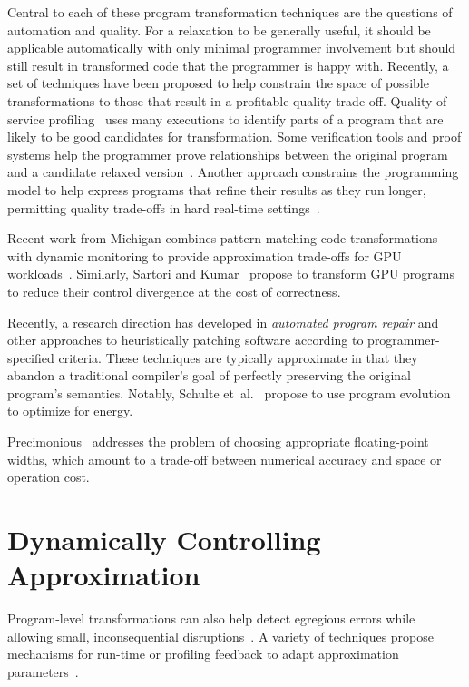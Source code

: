 Central to each of these program transformation techniques are the questions
of automation and quality. For a relaxation to be generally useful, it should
be applicable automatically with only minimal programmer involvement but
should still result in transformed code that the programmer is happy with.
Recently, a set of techniques have been proposed to help constrain the space
of possible transformations to those that result in a profitable
quality trade-off. Quality of service profiling~\cite{qosprof} uses many
executions to identify parts of a program that are likely to be good
candidates for transformation. Some verification tools and proof systems help
the programmer prove relationships between the original program and a
candidate relaxed version~\cite{carbin-pldi, carbin-races, carbin-pepm,
rice-transformation-semantics}.
Another approach constrains the programming model to help express programs
that refine their results as they run longer, permitting quality trade-offs in
hard real-time settings~\cite{chung90}.

Recent work from Michigan combines pattern-matching code transformations with
dynamic monitoring to provide approximation trade-offs for GPU
workloads~\cite{paraprox, sage}.
Similarly, Sartori and Kumar~\cite{herding} propose to transform GPU programs
to reduce their control divergence at the cost of correctness.

Recently, a research direction has developed in \emph{automated program
repair} and other approaches to heuristically patching software according to
programmer-specified criteria.
These techniques are typically approximate in that they abandon a traditional
compiler's goal of perfectly preserving the original program's semantics.
Notably, Schulte et~al.~\cite{schulte} propose to use program evolution to
optimize for energy.

Precimonious~\cite{precimonious} addresses the problem of choosing appropriate
floating-point widths, which amount to a trade-off between numerical accuracy
and space or operation cost.



\section{Dynamically Controlling Approximation}

Program-level transformations can also help detect egregious errors while
allowing small, inconsequential disruptions~\cite{lwc, approxdebug}.
A variety of techniques propose mechanisms for run-time or profiling feedback to adapt
approximation parameters~\cite{dynamicknobs, green, approxit, ansel-autotuning}.


